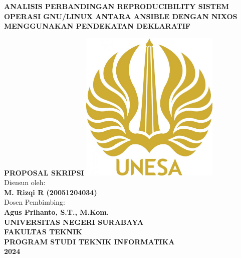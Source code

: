 \begin{titlepage}
	\begin{center}
    {\large \textbf{ANALISIS PERBANDINGAN REPRODUCIBILITY SISTEM OPERASI GNU/LINUX ANTARA ANSIBLE DENGAN NIXOS MENGGUNAKAN PENDEKATAN DEKLARATIF\\}}
    \vspace{0.5cm}

    \textbf{PROPOSAL SKRIPSI}
    \vfill
    \includegraphics[width=0.5\textwidth]{images/unesa.jpg}\\
    \vspace*{1cm}
    Disusun oleh:\\
    \textbf{M. Rizqi R (20051204034)}\\
    Dosen Pembimbing:\\
    \textbf{Agus Prihanto, S.T., M.Kom.}\\
    \vfill
    {\large \textbf{UNIVERSITAS NEGERI SURABAYA\\ FAKULTAS TEKNIK \\ PROGRAM STUDI TEKNIK INFORMATIKA \\ 2024}}
	\end{center}
\end{titlepage}
